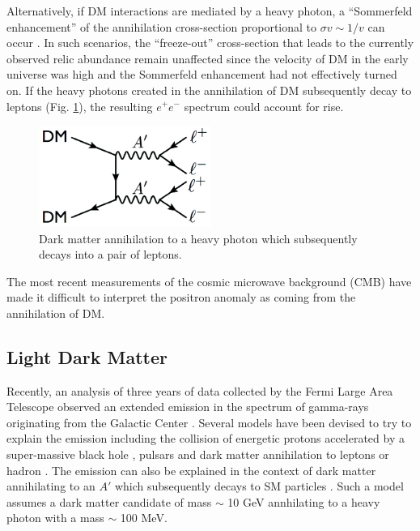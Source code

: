Alternatively, if DM interactions are mediated by a heavy photon, a 
``Sommerfeld enhancement'' of the annihilation cross-section proportional to
$\sigma v \sim 1/v$ can occur \cite{ArkaniHamed:2008qn}. In such scenarios, the
``freeze-out'' cross-section that leads to the currently observed relic
abundance remain unaffected since the velocity of DM in the early universe was
high and the Sommerfeld enhancement had not effectively turned on.  If the 
heavy photons created in the annihilation of DM subsequently decay to leptons
(Fig. \ref{fig:dm_annihilation}), the resulting $e^+e^-$ spectrum could
account for rise.
\begin{figure}[t]
    \centering
    \includegraphics[width=0.5\textwidth]{images/dm_annihilation.png}
    \caption{Dark matter annihilation to a heavy photon which subsequently 
             decays into a pair of leptons.}
    \label{fig:dm_annihilation}
\end{figure}

The most recent measurements of the cosmic microwave background (CMB) have made
it difficult to interpret the positron anomaly as coming from the annihilation
of DM.  


\subsection{Light Dark Matter}

Recently, an analysis of three years of data collected by the Fermi Large Area
Telescope observed an extended emission in the spectrum of gamma-rays 
originating from the Galactic Center 
\cite{hooper2011, linden2011, abazajian2012, hooper2013}.  Several models have been 
devised to try to explain the emission including the collision of energetic 
protons accelerated by a super-massive black hole \cite{Hooper:2010mq}, 
pulsars \cite{Abazajian:2010zy} and dark matter annihilation to leptons or 
hadron \cite{Hooper:2010mq, Goodenough:2009gk}.  The emission can also
be explained in the context of dark matter annihilating to an $A'$ which 
subsequently decays to SM particles \cite{Hooper:2012cw}.  Such a model assumes
a dark matter candidate of mass $\sim$ 10 GeV annhilating to a heavy photon
with a mass $\sim$ 100 MeV. 

